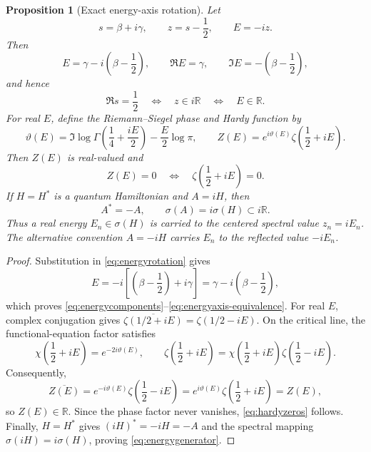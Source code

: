 \documentclass[11pt]{amsart}
\newtheorem{proposition}[theorem]{Proposition}
\theoremstyle{definition}
\theoremstyle{remark}
\begin{document}
\begin{proposition}[Exact energy-axis rotation]\label{prop:energy-axis-rotation}
Let
\begin{equation}\label{eq:energyrotation}
 s=\beta+i\gamma,
 \qquad z=s-\frac12,
 \qquad E=-iz.
\end{equation}
Then
\begin{equation}\label{eq:energycomponents}
 E=\gamma-i\left(\beta-\frac12\right),
 \qquad \Re E=\gamma,
 \qquad \Im E=-\left(\beta-\frac12\right),
\end{equation}
and hence
\begin{equation}\label{eq:energyaxis-equivalence}
 \Re s=\frac12
 \quad\Longleftrightarrow\quad
 z\in i\mathbb R
 \quad\Longleftrightarrow\quad
 E\in\mathbb R.
\end{equation}
For real $E$, define the Riemann--Siegel phase and Hardy function by
\begin{equation}\label{eq:hardyZ}
 \vartheta(E)=\Im\log\Gamma\!\left(\frac14+\frac{iE}{2}\right)
               -\frac{E}{2}\log\pi,
 \qquad
 Z(E)=e^{i\vartheta(E)}\zeta\!\left(\frac12+iE\right).
\end{equation}
Then $Z(E)$ is real-valued and
\begin{equation}\label{eq:hardyzeros}
 Z(E)=0
 \quad\Longleftrightarrow\quad
 \zeta\!\left(\frac12+iE\right)=0.
\end{equation}
If $H=H^*$ is a quantum Hamiltonian and $A=iH$, then
\begin{equation}\label{eq:energygenerator}
 A^*=-A,
 \qquad \sigma(A)=i\sigma(H)\subset i\mathbb R.
\end{equation}
Thus a real energy $E_n\in\sigma(H)$ is carried to the centered spectral value
$z_n=iE_n$.  The alternative convention $A=-iH$ carries $E_n$ to the reflected value
$-iE_n$.
\end{proposition}

\begin{proof}
Substitution in \eqref{eq:energyrotation} gives
\[
 E=-i\left[\left(\beta-\frac12\right)+i\gamma\right]
   =\gamma-i\left(\beta-\frac12\right),
\]
which proves \eqref{eq:energycomponents}--\eqref{eq:energyaxis-equivalence}.  For real $E$,
complex conjugation gives
$\overline{\zeta(1/2+iE)}=\zeta(1/2-iE)$.  On the critical line, the functional-equation
factor satisfies
\begin{equation}\label{eq:chi-theta}
 \chi\!\left(\frac12+iE\right)=e^{-2i\vartheta(E)},
 \qquad
 \zeta\!\left(\frac12+iE\right)
 =\chi\!\left(\frac12+iE\right)\zeta\!\left(\frac12-iE\right).
\end{equation}
Consequently,
\[
 \overline{Z(E)}
 =e^{-i\vartheta(E)}\zeta\!\left(\frac12-iE\right)
 =e^{i\vartheta(E)}\zeta\!\left(\frac12+iE\right)
 =Z(E),
\]
so $Z(E)\in\mathbb R$.  Since the phase factor never vanishes,
\eqref{eq:hardyzeros} follows.  Finally, $H=H^*$ gives
$(iH)^*=-iH=-A$ and the spectral mapping
$\sigma(iH)=i\sigma(H)$, proving \eqref{eq:energygenerator}.
\end{proof}
\end{document}
